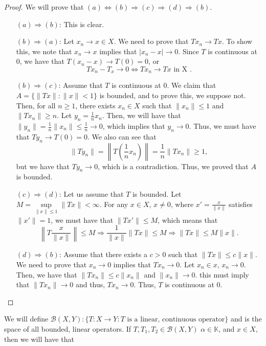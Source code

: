 \documentclass[12pt]{article}
\def\K{\mathbb{K}}
\newcommand{\B}{\mathscr{B}}
\begin{document}
\begin{proof}
We will prove that $(a) \Leftrightarrow (b) \Rightarrow (c) \Rightarrow (d) \Rightarrow (b)$. 
\begin{enumerate}[topsep=-15pt]
\item[$(a) \Rightarrow (b)$:] This is clear.
\item[$(b) \Rightarrow (a)$:] Let $x_n \to x \in X$. We need to prove that $Tx_n \to Tx$. To show this, we note that $x_n \to x$ implies that $|x_n - x| \to 0$. Since $T$ is continuous at 0, we have that $T(x_n - x) \to T(0) = 0$, or 
\[ Tx_n - T_x \to 0 \Longleftrightarrow Tx_n \to Tx \text{ in X }.\]
\item[$(b) \Rightarrow (c)$:] Assume that $T$ is continuous at 0. We claim that $A = \{ \| Tx \| : \| x \| < 1 \}$ is bounded, and to prove this, we suppose not. Then, for all $n \geq 1$, there exists $x_n \in X$ such that $\| x_n \| \leq 1$ and $\| Tx_n \| \geq n$. Let $y_n = \frac{1}{n} x_n$. Then, we will have that $\| y_n \| = \frac{1}{n} \| x_n \| \leq \frac{1}{n} \to 0$, which implies that $y_n \to 0$. Thus, we must have that $Ty_n \to T(0) = 0$. We also can see that 
\[ \| Ty_n \| = \left\| T \left(\frac{1}{n} x_n\right) \right\| = \frac{1}{n} \| T x_n \| \geq 1,\]
but we have that $Ty_n \to 0$, which is a contradiction. Thus, we proved that $A$ is bounded.
\item[$(c) \Rightarrow (d)$:] Let us assume that $T$ is bounded. Let $M = \sup\limits_{\| x \| \leq 1} \| Tx \| < \infty$. For any $x \in X$, $x \neq 0$, where $x' = \frac{x}{\| x \|}$ satisfies $\| x' \| = 1$, we must have that $\| Tx' \| \leq M$, which means that 
\[ \left\| T \frac{x}{\| x \|} \right\| \leq M \Longrightarrow \frac{1}{ \|x \|} \| Tx \| \leq M \Longrightarrow \| Tx \| \leq M \| x \|. \]
\item[$(d) \Rightarrow (b)$:] Assume that there exists a $c > 0$ such that $\| Tx \| \leq c \| x \|$. We need to prove that $x_n \to 0$ implies that $Tx_n \to 0$. Let $x_n \in x$, $x_n \to 0$. Then, we have that $\| T x_n \| \leq c \| x_n \|$ and $\| x_n \| \to 0$. this must imply that $\| Tx_n \| \to 0$ and thus, $Tx_n \to 0$. Thus, $T$ is continuous at 0. 
\end{enumerate}
\end{proof}
\vspace{-25pt}
We will define $\B(X,Y) : \{ T: X \to Y : T \text{ is a linear, continuous operator} \}$ and is the space of all bounded, linear operators. If $T, T_1, T_2 \in \B(X, Y)$ $\alpha \in \K$, and $x \in X$, then we will have that 
\end{document}
